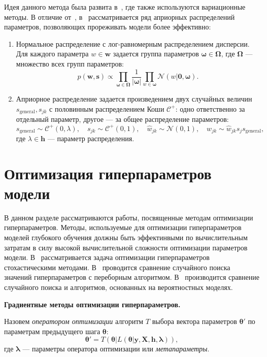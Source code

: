 Идея данного метода была развита в~\cite{bayes_compr}, где также используются вариационные методы.  В отличие от~\cite{nips}, в~\cite{bayes_compr} рассматривается ряд априорных распределений параметров, позволяющих прореживать модели более эффективно:
\begin{enumerate}
\item Нормальное распределение с лог-равномерным распределением дисперсии. Для каждого параметра $w \in \mathbf{w}$ задается группа параметров $\boldsymbol{\omega} \in \boldsymbol{\Omega}$, где $\boldsymbol{\Omega}$ --- множество всех групп параметров:
\[
    p(\mathbf{w}, \mathbf{s}) \propto \prod_{\boldsymbol{\omega} \in \boldsymbol{\Omega}} \frac{1}{|\boldsymbol{\omega}|}\prod_{w \in \boldsymbol{\omega}}\mathcal{N}(w|\mathbf{0}, \boldsymbol{\omega}).
\]
\item Априорное распределение задается произведением двух случайных величин ${s}_{\text{general}}, {s}_{jk}$ с половинным распределением Коши $\mathcal{C}^{+}$: одно ответственно за отдельный параметр, другое --- за общее распределение параметров:
\[
    {s}_{\text{general}} \sim \mathcal{C}^{+}(0, \lambda), \quad  {s}_{jk} \sim \mathcal{C}^{+}(0,1), \quad \hat{w}_{jk} \sim \mathcal{N}(0,1), \quad w_{jk} \sim \hat{w}_{jk}s_j  {s}_{\text{general}},
\]
где $\lambda \in \mathbf{h}$ --- параметр распределения.

\end{enumerate}

\section{Оптимизация гиперпараметров модели}
В данном разделе рассматриваются работы, посвященные методам оптимизации гиперпараметров. Методы, используемые для оптимизации гиперпараметров моделей глубокого обучения должны быть эффектинвыми по вычислительным затратам в силу высокой вычислительной сложности оптимизации параметров модели. 
В~\cite{random1,random2} рассматривается задача оптимизации гиперпараметров стохастическими методами. В~\cite{random1} проводится сравнение случайного поиска значений гиперпараметров с переборным алгоритмом. В~\cite{random2} производится сравнение случайного поиска и алгоритмов, основанных на вероятностных моделях.

\textbf{Градиентные методы оптимизации гиперпараметров. } 
\begin{defin} Назовем \textit{оператором оптимизации} алгоритм $T$ выбора вектора параметров $\boldsymbol{\theta}'$  по параметрам предыдущего шага $\boldsymbol{\theta}$:
\begin{equation}
\label{eq:optim_operator}
	\boldsymbol{\theta}' = T(\boldsymbol{\theta} |L(\boldsymbol{\theta} |\mathbf{y},\mathbf{X},\mathbf{h},\boldsymbol{\lambda})),
\end{equation}
где $\boldsymbol{\lambda}$ --- параметры оператора оптимизации или \textit{метапараметры}.
\end{defin}

